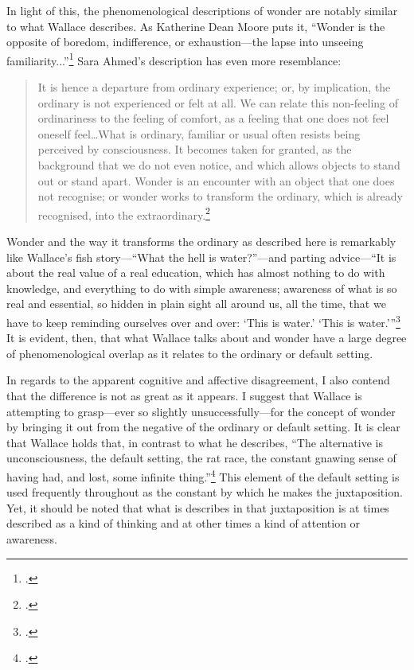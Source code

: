 \documentclass[letterpaper,notitlepage,12pt]{article}
\begin{document}
In light of this, the phenomenological descriptions of wonder are notably similar
to what Wallace describes.
As Katherine Dean Moore puts it, ``Wonder is the opposite of boredom,
indifference, or exhaustion---the lapse into unseeing
familiarity...''\footcite[p. 289]{moore_truth_2005}
Sara Ahmed's description has even more resemblance:
\begin{quotation}
It is hence a departure from ordinary experience; or, by implication, the
ordinary is not experienced or felt at all. We can relate this non-feeling of
ordinariness to the feeling of comfort, as a feeling that one does not feel
oneself feel\ldots What is ordinary, familiar or usual often resists being
perceived by consciousness. It becomes taken for granted, as the background that
we do not even notice, and which allows objects to stand out or stand apart.
Wonder is an encounter with an object that one does not recognise; or wonder
works to transform the ordinary, which is already recognised, into the
extraordinary.\footcite[p. 179]{ahmed_cultural_2004}
\end{quotation}
Wonder and the way it transforms the ordinary as described here is remarkably
like Wallace's fish story---``What the hell is water?''---and parting
advice---``It is about the real value of a real education, which has almost
nothing to do with knowledge, and everything to do with simple awareness;
awareness of what is so real and essential, so hidden in plain sight all around
us, all the time, that we have to keep reminding ourselves over and over: `This
is water.' `This is water.'''\footcite{david_foster_wallace_this_2005}
It is evident, then, that what Wallace talks about and wonder have a large
degree of phenomenological overlap as it relates to the ordinary or
default setting.

In regards to the apparent cognitive and affective disagreement, I also contend
that the difference is not as great as it appears.
I suggest that Wallace is attempting to grasp---ever so slightly
unsuccessfully---for the concept of wonder by bringing it out from the negative
of the ordinary or default setting.
It is clear that Wallace holds that, in contrast to what he describes, ``The
alternative is unconsciousness, the default setting, the rat race, the constant
gnawing sense of having had, and lost, some infinite
thing.''\footcite{david_foster_wallace_this_2005}
This element of the default setting is used frequently throughout as the
constant by which he makes the juxtaposition.
Yet, it should be noted that what is describes in that juxtaposition is at times
described as a kind of thinking and at other times a kind of attention or
awareness.
\end{document}
